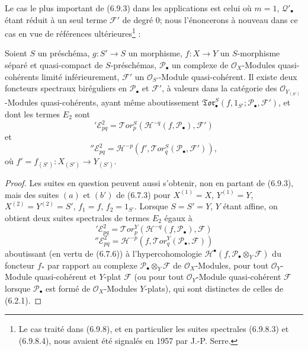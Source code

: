 Le cas le plus important de (6.9.3) dans les applications est celui où $m=1$,
$\mathscr Q'_\bullet$ étant réduit à un seul terme $\mathscr F'$ de degré
$0$; nous l'énoncerons à nouveau dans ce cas en vue de références
ultérieures\footnote{Le cas traité dans (6.9.8), et en particulier les suites
spectrales (6.9.8.3) et (6.9.8.4), nous avaient été signalés en 1957 par
J.-P. Serre.} :

\begin{proposition}[6.9.8]
Soient $S$ un préschéma, $g:S'\to S$ un morphisme,
$f:X\to Y$ un $S$-morphisme séparé et quasi-compact de $S$-préschémas,
$\mathscr P_\bullet$ un complexe de $\mathscr O_X$-Modules quasi-cohérents
limité inférieurement, $\mathscr F'$ un $\mathscr O_{S'}$-Module
quasi-cohérent. Il existe deux foncteurs spectraux biréguliers en
$\mathscr P_\bullet$ et $\mathscr F'$, à valeurs dans la catégorie des
$\mathscr O_{Y_{(S')}}$-Modules quasi-cohérents, ayant même aboutissement
$\mathfrak{Tor}_\bullet^S(f,1_{S'};\mathscr P_\bullet,\mathscr F')$, et dont
les termes $E_2$ sont
\[
  {}'\mathscr E_{pq}^2
  =\mathscr{T}\!or_p^S
  (\mathscr H^{-q}(f,\mathscr P_\bullet),\mathscr F')
  \tag{6.9.8.1}\label{III.6.9.8.1.fr}
\]
et
\[
  {}''\mathscr E_{pq}^2
  =\mathscr H^{-p}
  (f',\mathscr{T}\!or_q^S(\mathscr P_\bullet,\mathscr F')),
  \tag{6.9.8.2}\label{III.6.9.8.2.fr}
\]
où $f'=f_{(S')}:X_{(S')}\to Y_{(S')}$. 
\end{proposition}

\begin{proof}
Les suites en question peuvent aussi s'obtenir, non en partant de (6.9.3),
mais des suites $(a)$ et $(b')$ de (6.7.3) pour
$X^{(1)}=X$, $Y^{(1)}=Y$, $X^{(2)}=Y^{(2)}=S'$, $f_1=f$,
$f_2=1_{S'}$. Lorsque $S=S'=Y$, $Y$ étant affine, on obtient deux suites
spectrales de termes $E_2$ égaux à
\[
  {}'\mathscr E_{pq}^2
  =\mathscr{T}\!or_p^Y
  (\mathscr H^{-q}(f,\mathscr P_\bullet),\mathscr F)
  \tag{6.9.8.3}\label{III.6.9.8.3.fr}
\]
\[
  {}''\mathscr E_{pq}^2
  =\mathscr H^{-p}
  (f,\mathscr{T}\!or_q^Y(\mathscr P_\bullet,\mathscr F))
  \tag{6.9.8.4}\label{III.6.9.8.4.fr}
\]
aboutissant (en vertu de (6.7.6)) à l'hypercohomologie
$\mathscr H^\bullet(f,\mathscr P_\bullet\otimes_Y\mathscr F)$ du foncteur
$f_*$ par rapport au complexe
$\mathscr P_\bullet\otimes_Y\mathscr F$ de $\mathscr O_X$-Modules, pour tout
$\mathscr O_Y$-Module quasi-cohérent et $Y$-plat $\mathscr F$ (ou pour tout
$\mathscr O_Y$-Module quasi-cohérent $\mathscr F$ lorsque
$\mathscr P_\bullet$ est formé de $\mathscr O_X$-Modules $Y$-plats), qui sont
distinctes de celles de (6.2.1).
\end{proof}

